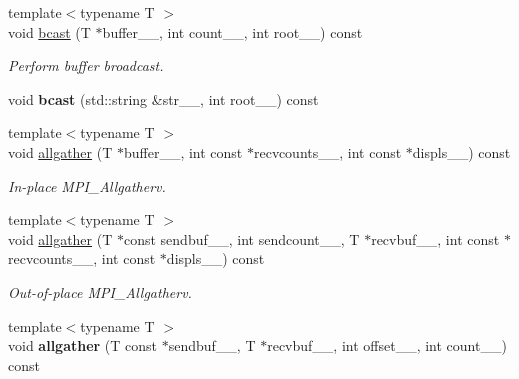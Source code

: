 \begin{DoxyCompactItemize}
\item 
{\footnotesize template$<$typename T $>$ }\\void \hyperlink{classsddk_1_1_communicator_afc6c3a41d5b4b4b183157f88272eea76}{bcast} (T $\ast$buffer\+\_\+\+\_\+, int count\+\_\+\+\_\+, int root\+\_\+\+\_\+) const 
\begin{DoxyCompactList}\small\item\em Perform buffer broadcast. \end{DoxyCompactList}\item 
\hypertarget{classsddk_1_1_communicator_a093f3fd7b328d2e2d007d913b8295797}{}void {\bfseries bcast} (std\+::string \&str\+\_\+\+\_\+, int root\+\_\+\+\_\+) const \label{classsddk_1_1_communicator_a093f3fd7b328d2e2d007d913b8295797}

\item 
{\footnotesize template$<$typename T $>$ }\\void \hyperlink{classsddk_1_1_communicator_a4c99b71f6148a3eb1a8cef348381b8a0}{allgather} (T $\ast$buffer\+\_\+\+\_\+, int const $\ast$recvcounts\+\_\+\+\_\+, int const $\ast$displs\+\_\+\+\_\+) const 
\begin{DoxyCompactList}\small\item\em In-\/place M\+P\+I\+\_\+\+Allgatherv. \end{DoxyCompactList}\item 
{\footnotesize template$<$typename T $>$ }\\void \hyperlink{classsddk_1_1_communicator_aacae5f952656a7ab4c6080d3a78221b3}{allgather} (T $\ast$const sendbuf\+\_\+\+\_\+, int sendcount\+\_\+\+\_\+, T $\ast$recvbuf\+\_\+\+\_\+, int const $\ast$recvcounts\+\_\+\+\_\+, int const $\ast$displs\+\_\+\+\_\+) const 
\begin{DoxyCompactList}\small\item\em Out-\/of-\/place M\+P\+I\+\_\+\+Allgatherv. \end{DoxyCompactList}\item 
\hypertarget{classsddk_1_1_communicator_a4bda7ba6195f52c55532195142442e56}{}{\footnotesize template$<$typename T $>$ }\\void {\bfseries allgather} (T const $\ast$sendbuf\+\_\+\+\_\+, T $\ast$recvbuf\+\_\+\+\_\+, int offset\+\_\+\+\_\+, int count\+\_\+\+\_\+) const \label{classsddk_1_1_communicator_a4bda7ba6195f52c55532195142442e56}


\end{DoxyCompactItemize}
